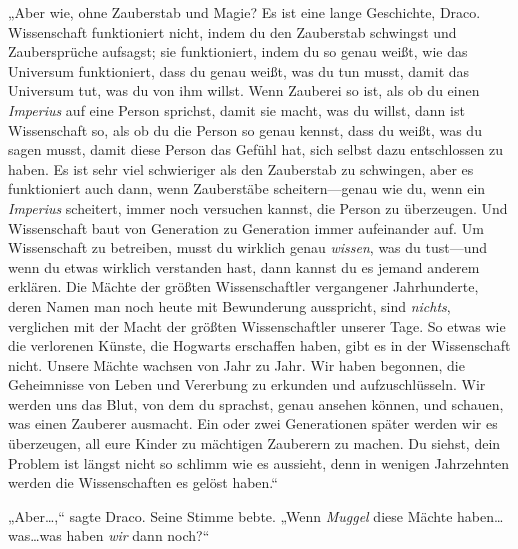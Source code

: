„Aber wie, ohne Zauberstab und Magie? Es ist eine lange Geschichte, Draco. Wissenschaft funktioniert nicht, indem du den Zauberstab schwingst und Zaubersprüche aufsagst; sie funktioniert, indem du so genau weißt, wie das Universum funktioniert, dass du genau weißt, was du tun musst, damit das Universum tut, was du von ihm willst. Wenn Zauberei so ist, als ob du einen \emph{Imperius} auf eine Person sprichst, damit sie macht, was du willst, dann ist Wissenschaft so, als ob du die Person so genau kennst, dass du weißt, was du sagen musst, damit diese Person das Gefühl hat, sich selbst dazu entschlossen zu haben. Es ist sehr viel schwieriger als den Zauberstab zu schwingen, aber es funktioniert auch dann, wenn Zauberstäbe scheitern—genau wie du, wenn ein \emph{Imperius} scheitert, immer noch versuchen kannst, die Person zu überzeugen. Und Wissenschaft baut von Generation zu Generation immer aufeinander auf. Um Wissenschaft zu betreiben, musst du wirklich genau \emph{wissen}, was du tust—und wenn du etwas wirklich verstanden hast, dann kannst du es jemand anderem erklären. Die Mächte der größten Wissenschaftler vergangener Jahrhunderte, deren Namen man noch heute mit Bewunderung ausspricht, sind \emph{nichts}, verglichen mit der Macht der größten Wissenschaftler unserer Tage. So etwas wie die verlorenen Künste, die Hogwarts erschaffen haben, gibt es in der Wissenschaft nicht. Unsere Mächte wachsen von Jahr zu Jahr. Wir haben begonnen, die Geheimnisse von Leben und Vererbung zu erkunden und aufzuschlüsseln. Wir werden uns das Blut, von dem du sprachst, genau ansehen können, und schauen, was einen Zauberer ausmacht. Ein oder zwei Generationen später werden wir es überzeugen, all eure Kinder zu mächtigen Zauberern zu machen. Du siehst, dein Problem ist längst nicht so schlimm wie es aussieht, denn in wenigen Jahrzehnten werden die Wissenschaften es gelöst haben.“

„Aber…,“ sagte Draco. Seine Stimme bebte. „Wenn \emph{Muggel} diese Mächte haben…was…was haben \emph{wir} dann noch?“

